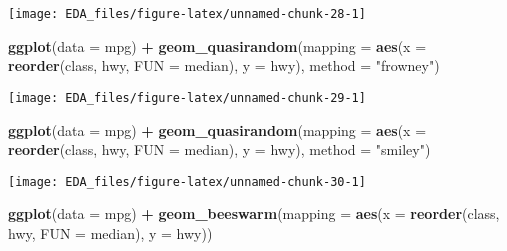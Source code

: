 \documentclass[]{book}
\newenvironment{Shaded}{\begin{snugshade}}{\end{snugshade}}
\newcommand{\DataTypeTok}[1]{\textcolor[rgb]{0.13,0.29,0.53}{#1}}
\newcommand{\KeywordTok}[1]{\textcolor[rgb]{0.13,0.29,0.53}{\textbf{#1}}}
\newcommand{\NormalTok}[1]{#1}
\newcommand{\OperatorTok}[1]{\textcolor[rgb]{0.81,0.36,0.00}{\textbf{#1}}}
\newcommand{\StringTok}[1]{\textcolor[rgb]{0.31,0.60,0.02}{#1}}
\theoremstyle{plain}
\theoremstyle{remark}
\theoremstyle{definition}
\theoremstyle{definition}
\theoremstyle{definition}
\theoremstyle{remark}
\begin{document}
\begin{center}\texttt{[image: EDA\_files/figure-latex/unnamed-chunk-28-1]} \end{center}

\begin{Shaded}
\begin{Highlighting}[]
\KeywordTok{ggplot}\NormalTok{(}\DataTypeTok{data =}\NormalTok{ mpg) }\OperatorTok{+}
\StringTok{  }\KeywordTok{geom_quasirandom}\NormalTok{(}\DataTypeTok{mapping =} \KeywordTok{aes}\NormalTok{(}\DataTypeTok{x =} \KeywordTok{reorder}\NormalTok{(class, hwy, }\DataTypeTok{FUN =}\NormalTok{ median),}
                                 \DataTypeTok{y =}\NormalTok{ hwy),}
                   \DataTypeTok{method =} \StringTok{"frowney"}\NormalTok{)}
\end{Highlighting}
\end{Shaded}

\begin{center}\texttt{[image: EDA\_files/figure-latex/unnamed-chunk-29-1]} \end{center}

\begin{Shaded}
\begin{Highlighting}[]
\KeywordTok{ggplot}\NormalTok{(}\DataTypeTok{data =}\NormalTok{ mpg) }\OperatorTok{+}
\StringTok{  }\KeywordTok{geom_quasirandom}\NormalTok{(}\DataTypeTok{mapping =} \KeywordTok{aes}\NormalTok{(}\DataTypeTok{x =} \KeywordTok{reorder}\NormalTok{(class, hwy, }\DataTypeTok{FUN =}\NormalTok{ median),}
                                 \DataTypeTok{y =}\NormalTok{ hwy),}
                   \DataTypeTok{method =} \StringTok{"smiley"}\NormalTok{)}
\end{Highlighting}
\end{Shaded}

\begin{center}\texttt{[image: EDA\_files/figure-latex/unnamed-chunk-30-1]} \end{center}

\begin{Shaded}
\begin{Highlighting}[]
\KeywordTok{ggplot}\NormalTok{(}\DataTypeTok{data =}\NormalTok{ mpg) }\OperatorTok{+}
\StringTok{  }\KeywordTok{geom_beeswarm}\NormalTok{(}\DataTypeTok{mapping =} \KeywordTok{aes}\NormalTok{(}\DataTypeTok{x =} \KeywordTok{reorder}\NormalTok{(class, hwy, }\DataTypeTok{FUN =}\NormalTok{ median),}
                                 \DataTypeTok{y =}\NormalTok{ hwy))}
\end{Highlighting}
\end{Shaded}
\end{document}
